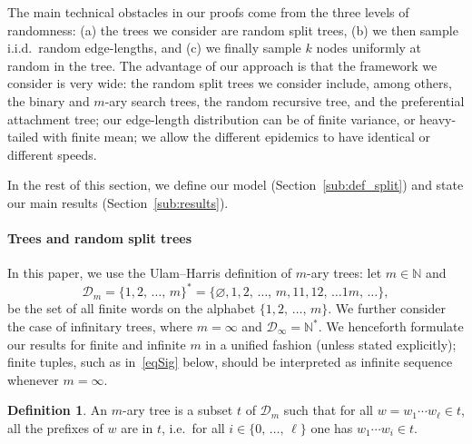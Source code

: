 \documentclass[10pt]{amsart}
\theoremstyle{definition}\newtheorem{defi}[theo]{Definition}\newtheorem{rema}[theo]{Remark}\newtheorem{exam}[theo]{Example}\newtheorem{exem}[theo]{Example}\newtheorem{nota}[theo]{Notation}
\newcommand{\bbN}{\mathbb{N}}
\newcommand{\clD}{\mathcal{D}}
\begin{document}
The main technical obstacles in our proofs come from the three levels of randomness: (a) the trees we consider are random split trees, (b) we then sample i.i.d.\ random edge-lengths, and (c) we finally sample $k$ nodes uniformly at random in the tree. The advantage of our approach is that the framework we consider is very wide: the random split trees we consider include, among others, the binary and $m$-ary search trees, the random recursive tree, and the preferential attachment tree; our edge-length distribution can be of finite variance, or heavy-tailed with finite mean; we allow the different epidemics to have identical or different speeds.

In the rest of this section, we define our model (Section~\ref{sub:def_split}) and state our main results (Section~\ref{sub:results}).


\paragraph*{Trees and random split trees}\label{sub:def_split}

In this paper, we use the Ulam--Harris definition of $m$-ary trees: let $m\in\bbN$ and
\[
\clD_m = \{1, 2,\, \ldots,\, m\}^* = \{\varnothing, 1, 2, \,\ldots,\, m, 11, 12,\, \ldots 1m,\, \ldots\},
\]
be the set of all finite words on the alphabet $\{1, 2, \,\ldots,\, m\}$. We further consider the case of infinitary trees, where $m=\infty$ and $\clD_\infty = \bbN^*$. We henceforth formulate our results for finite and infinite $m$ in a unified fashion (unless stated explicitly); finite tuples, such as in~\eqref{eqSig} below, should be interpreted as infinite sequence whenever $m=\infty$.

\begin{defi}\label{def:tree}
An $m$-ary tree is a subset $t$ of $\clD_m$ such that for all $w=w_1\cdots w_\ell\in t$, all the prefixes of $w$ are in $t$, i.e.\ for all $i\in \{0, \,\ldots,\, \ell\}$ one has $w_1\cdots w_i\in t$.
\end{defi}
\end{document}
